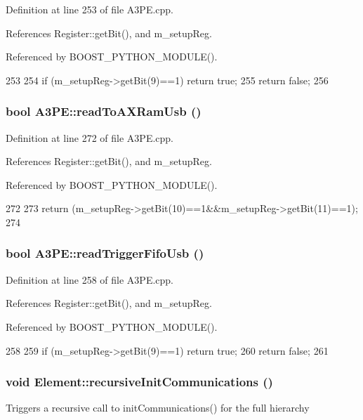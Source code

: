 Definition at line 253 of file A3PE.cpp.

References Register::getBit(), and m\_\-setupReg.

Referenced by BOOST\_\-PYTHON\_\-MODULE().


\begin{DoxyCode}
253                              {
254   if (m_setupReg->getBit(9)==1) return true;
255   return false;
256 }
\end{DoxyCode}
\hypertarget{classA3PE_af3152e461d446f442cfa7b69456ac276}{
\subsubsection[{readToAXRamUsb}]{\setlength{\rightskip}{0pt plus 5cm}bool A3PE::readToAXRamUsb ()}}
\label{classA3PE_af3152e461d446f442cfa7b69456ac276}


Definition at line 272 of file A3PE.cpp.

References Register::getBit(), and m\_\-setupReg.

Referenced by BOOST\_\-PYTHON\_\-MODULE().


\begin{DoxyCode}
272                          {
273   return (m_setupReg->getBit(10)==1&&m_setupReg->getBit(11)==1);
274 }
\end{DoxyCode}
\hypertarget{classA3PE_a083315774486528a8b6c40e240fbf98f}{
\subsubsection[{readTriggerFifoUsb}]{\setlength{\rightskip}{0pt plus 5cm}bool A3PE::readTriggerFifoUsb ()}}
\label{classA3PE_a083315774486528a8b6c40e240fbf98f}


Definition at line 258 of file A3PE.cpp.

References Register::getBit(), and m\_\-setupReg.

Referenced by BOOST\_\-PYTHON\_\-MODULE().


\begin{DoxyCode}
258                              {
259   if (m_setupReg->getBit(9)==1) return true;
260   return false;
261 }
\end{DoxyCode}
\hypertarget{classElement_a82119ed37dff76508a2746a853ec35ba}{
\subsubsection[{recursiveInitCommunications}]{\setlength{\rightskip}{0pt plus 5cm}void Element::recursiveInitCommunications ()}}
\label{classElement_a82119ed37dff76508a2746a853ec35ba}
Triggers a recursive call to initCommunications() for the full hierarchy

